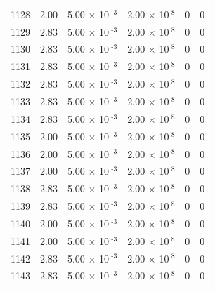 \documentclass[a4paper,11pt]{article}
\begin{document}
\begin{center}
\begin{longtable}{|R{1.5cm}|R{2.4cm}|R{2.4cm}|R{2.4cm}|R{2.4cm}|R{2.4cm}|}
 1128 &   2.00  &         5.00 $\times$ 10$^{\text{          -3}}$  &         2.00 $\times$ 10$^{\text{           8}}$  & 0  & 0 \\
 1129 &   2.83  &         5.00 $\times$ 10$^{\text{          -3}}$  &         2.00 $\times$ 10$^{\text{           8}}$  & 0  & 0 \\
 1130 &   2.83  &         5.00 $\times$ 10$^{\text{          -3}}$  &         2.00 $\times$ 10$^{\text{           8}}$  & 0  & 0 \\
 1131 &   2.83  &         5.00 $\times$ 10$^{\text{          -3}}$  &         2.00 $\times$ 10$^{\text{           8}}$  & 0  & 0 \\
 1132 &   2.83  &         5.00 $\times$ 10$^{\text{          -3}}$  &         2.00 $\times$ 10$^{\text{           8}}$  & 0  & 0 \\
 1133 &   2.83  &         5.00 $\times$ 10$^{\text{          -3}}$  &         2.00 $\times$ 10$^{\text{           8}}$  & 0  & 0 \\
 1134 &   2.83  &         5.00 $\times$ 10$^{\text{          -3}}$  &         2.00 $\times$ 10$^{\text{           8}}$  & 0  & 0 \\
 1135 &   2.00  &         5.00 $\times$ 10$^{\text{          -3}}$  &         2.00 $\times$ 10$^{\text{           8}}$  & 0  & 0 \\
 1136 &   2.00  &         5.00 $\times$ 10$^{\text{          -3}}$  &         2.00 $\times$ 10$^{\text{           8}}$  & 0  & 0 \\
 1137 &   2.00  &         5.00 $\times$ 10$^{\text{          -3}}$  &         2.00 $\times$ 10$^{\text{           8}}$  & 0  & 0 \\
 1138 &   2.83  &         5.00 $\times$ 10$^{\text{          -3}}$  &         2.00 $\times$ 10$^{\text{           8}}$  & 0  & 0 \\
 1139 &   2.83  &         5.00 $\times$ 10$^{\text{          -3}}$  &         2.00 $\times$ 10$^{\text{           8}}$  & 0  & 0 \\
 1140 &   2.00  &         5.00 $\times$ 10$^{\text{          -3}}$  &         2.00 $\times$ 10$^{\text{           8}}$  & 0  & 0 \\
 1141 &   2.00  &         5.00 $\times$ 10$^{\text{          -3}}$  &         2.00 $\times$ 10$^{\text{           8}}$  & 0  & 0 \\
 1142 &   2.83  &         5.00 $\times$ 10$^{\text{          -3}}$  &         2.00 $\times$ 10$^{\text{           8}}$  & 0  & 0 \\
 1143 &   2.83  &         5.00 $\times$ 10$^{\text{          -3}}$  &         2.00 $\times$ 10$^{\text{           8}}$  & 0  & 0 \\

\end{longtable}
\end{center}
\end{document}
